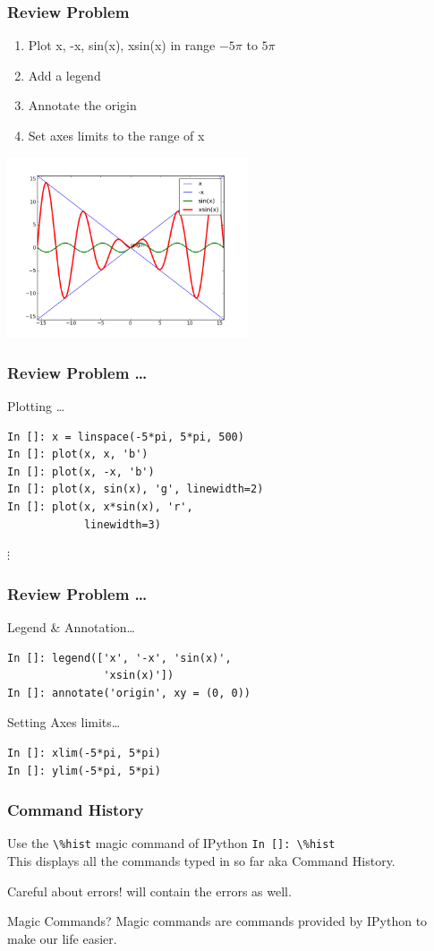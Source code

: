 \documentclass[14pt,compress]{beamer}
\newcommand{\typ}[1]{\lstinline{#1}}
\newcommand{\kwrd}[1]{ \texttt{\textbf{\color{blue}{#1}}}  }
\begin{document}
\begin{frame}[fragile]
\frametitle{Review Problem}
\begin{enumerate}
\item Plot x, -x, sin(x), xsin(x) in range $-5\pi$ to $5\pi$
\item Add a legend
\item Annotate the origin
\item Set axes limits to the range of x
\end{enumerate}
\vspace*{-0.1in}
\begin{center}
  \includegraphics[height=2.1in, interpolate=true]{data/four_plot}  
\end{center}
\end{frame}

\begin{frame}[fragile]
\frametitle{Review Problem \ldots}
\alert{Plotting \ldots}
\begin{lstlisting}
In []: x = linspace(-5*pi, 5*pi, 500)
In []: plot(x, x, 'b')
In []: plot(x, -x, 'b')
In []: plot(x, sin(x), 'g', linewidth=2)
In []: plot(x, x*sin(x), 'r', 
            linewidth=3)
\end{lstlisting}
$\vdots$
\end{frame}

\begin{frame}[fragile]
\frametitle{Review Problem \ldots}
\alert{Legend \& Annotation\ldots}
\begin{lstlisting}
In []: legend(['x', '-x', 'sin(x)', 
               'xsin(x)'])
In []: annotate('origin', xy = (0, 0))
\end{lstlisting}
\alert{Setting Axes limits\ldots}
\begin{lstlisting}
In []: xlim(-5*pi, 5*pi)
In []: ylim(-5*pi, 5*pi)
\end{lstlisting}
\end{frame}

\begin{frame}[fragile]
\frametitle{Command History}
Use the \typ{\%hist} \alert{magic} command of IPython 
\typ{In []: \%hist}\\
This displays all the commands typed in so far aka Command History.
\begin{block}{Careful about errors!}
  \kwrd{\%hist} will contain the errors as well.\\
\end{block}
\begin{block}{Magic Commands?}
  Magic commands are commands provided by IPython to make our life easier.
\end{block}
\end{frame}
\end{document}
